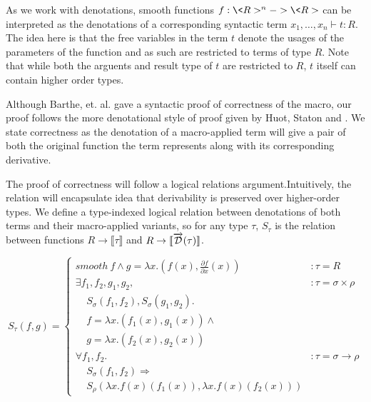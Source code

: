 \documentclass[11pt, final]{article}
\begin{document}
  As we work with denotations, smooth functions $f : \<R>^n -> \<R>$ can be interpreted as the denotations of a corresponding syntactic term $x_1, \dots, x_n \vdash t : R$.
  The idea here is that the free variables in the term $t$ denote the usages of the parameters of the function and as such are restricted to terms of type $R$.
  Note that while both the arguents and result type of $t$ are restricted to $R$, $t$ itself can contain higher order types.

  Although Barthe, et. al.\cite{barthe2020versatility} gave a syntactic proof of correctness of the macro, our proof follows the more denotational style of proof given by Huot, Staton and \Vakar{}\cite{huot2020correctness}.
  We state correctness as the denotation of a macro-applied term will give a pair of both the original function the term represents along with its corresponding derivative.

  The proof of correctness will follow a logical relations argument.Intuitively, the relation will encapsulate idea that derivability is preserved over higher-order types.
  We define a type-indexed logical relation between denotations of both terms and their macro-applied variants, so for any type $\tau$, $S_\tau$ is the relation between functions $R \rightarrow \llbracket \tau \rrbracket$ and $R \rightarrow \llbracket \overrightarrow{\mathcal{D}}(\tau) \rrbracket$.

  \begin{equation}
    S_\tau(f, g) =
      \left\{
        \begin{array}{ll}
          smooth\ f \wedge
            g = \lambda x. (f(x), \frac{\partial f}{\partial x}(x))
            & : \tau = R \\
          \exists f_1, f_2, g_1, g_2,
            & : \tau = \sigma \times \rho \\
            \;\;\;\;S_\sigma(f_1, f_2), S_\sigma(g_1, g_2). \\
            \;\;\;\;f = \lambda x. (f_1(x), g_1(x)) \wedge \\
            \;\;\;\;g = \lambda x. (f_2(x), g_2(x)) \\
          \forall f_1, f_2.
            & : \tau = \sigma \rightarrow \rho \\
            \;\;\;\;S_\sigma(f_1, f_2) \Rightarrow \\
            \;\;\;\;S_\rho(\lambda x. f(x)(f_1(x)),\lambda x. f(x)(f_2(x)))
        \end{array}
      \right.
  \label{eqn:lr_base}
  \end{equation}
\end{document}
